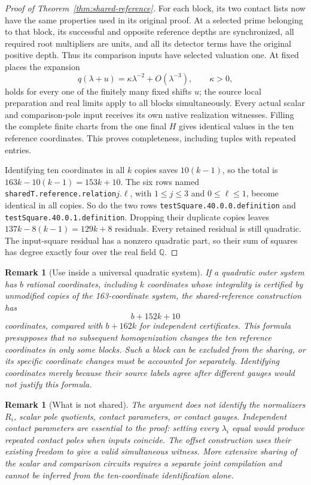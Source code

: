 \documentclass[11pt]{article}
\newtheorem{remark}[theorem]{Remark}
\begin{document}
\begin{proof}[Proof of Theorem~\ref{thm:shared-reference}]
For each block, its two contact lists now have the same properties
used in its original proof.  At a selected prime belonging to that
block, its successful and opposite reference depths are synchronized,
all required root multipliers are units, and all its detector terms
have the original positive depth.  Thus its comparison inputs have
selected valuation one.  At fixed places the expansion
\[
 q(\lambda+u)=\kappa\lambda^{-2}+O(\lambda^{-3}),\qquad \kappa>0,
\]
holds for every one of the finitely many fixed shifts $u$; the source
local preparation and real limits apply to all blocks simultaneously.
Every actual scalar and comparison-pole input receives its own native
realization witnesses.  Filling the complete finite charts from the
one final $H$ gives identical values in the ten reference coordinates.
This proves completeness, including tuples with repeated entries.

Identifying ten coordinates in all $k$ copies saves $10(k-1)$,
so the total is $163k-10(k-1)=153k+10$.  The six rows named
\texttt{sharedT.reference.relation}$j$.\texttt{$\ell$}, with
$1\le j\le3$ and $0\le\ell\le1$, become identical in all copies.
So do the two rows
\texttt{testSquare.40.0.0.definition} and
\texttt{testSquare.40.0.1.definition}.  Dropping their duplicate
copies leaves $137k-8(k-1)=129k+8$ residuals.  Every retained
residual is still quadratic.  The input-square residual has a
nonzero quadratic part, so their sum of squares has degree exactly
four over the real field $\mathbb Q$.
\end{proof}

\begin{remark}[Use inside a universal quadratic system]
If a quadratic outer system has $b$ rational coordinates, including
$k$ coordinates whose integrality is certified by unmodified copies
of the 163-coordinate system, the shared-reference construction has
\[
                    b+152k+10
\]
coordinates, compared with $b+162k$ for independent certificates.
This formula presupposes that no subsequent homogenization changes
the ten reference coordinates in only some blocks.  Such a block
can be excluded from the sharing, or its specific coordinate changes
must be accounted for separately.  Identifying coordinates merely
because their source labels agree after different gauges would not
justify this formula.
\end{remark}

\begin{remark}[What is not shared]
The argument does not identify the normalizers $R_i$, scalar pole
quotients, contact parameters, or contact gauges.  Independent contact
parameters are essential to the proof: setting every $\lambda_i$
equal would produce repeated contact poles when inputs coincide.
The offset construction uses their existing freedom to give a valid
simultaneous witness.  More extensive sharing of the scalar and
comparison circuits requires a separate joint compilation and cannot
be inferred from the ten-coordinate identification alone.
\end{remark}
\end{document}
